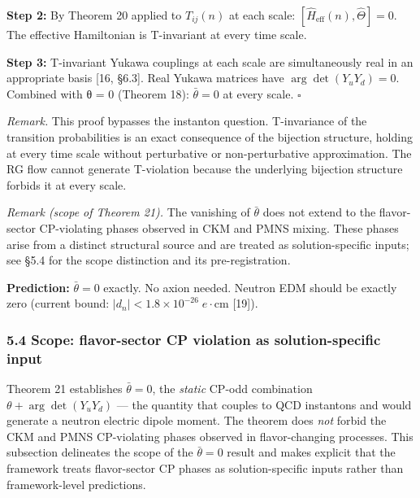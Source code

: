 \documentclass[
]{article}
\begin{document}
\textbf{Step 2:} By Theorem 20 applied to \(T_{ij}(n)\) at each scale:
\([\hat{H}_{\mathrm{eff}}(n), \hat{\Theta}] = 0\). The effective
Hamiltonian is T-invariant at every time scale.

\textbf{Step 3:} T-invariant Yukawa couplings at each scale are
simultaneously real in an appropriate basis {[}16, §6.3{]}. Real Yukawa
matrices have \(\arg\det(Y_u Y_d) = 0\). Combined with θ = 0 (Theorem
18): \(\bar{\theta} = 0\) at every scale. \(\square\)

\emph{Remark.} This proof bypasses the instanton question. T-invariance
of the transition probabilities is an exact consequence of the bijection
structure, holding at every time scale without perturbative or
non-perturbative approximation. The RG flow cannot generate T-violation
because the underlying bijection structure forbids it at every scale.

\emph{Remark (scope of Theorem 21).} The vanishing of \(\bar\theta\)
does not extend to the flavor-sector CP-violating phases observed in CKM
and PMNS mixing. These phases arise from a distinct structural source
and are treated as solution-specific inputs; see §5.4 for the scope
distinction and its pre-registration.

\textbf{Prediction:} \(\bar{\theta} = 0\) exactly. No axion needed.
Neutron EDM should be exactly zero (current bound:
\(|d_n| < 1.8 \times 10^{-26}\;e\cdot\text{cm}\) {[}19{]}).

\hypertarget{scope-flavor-sector-cp-violation-as-solution-specific-input}{%
\subsubsection{5.4 Scope: flavor-sector CP violation as
solution-specific
input}\label{scope-flavor-sector-cp-violation-as-solution-specific-input}}

Theorem 21 establishes \(\bar\theta = 0\), the \emph{static} CP-odd
combination \(\theta + \arg\det(Y_u Y_d)\) --- the quantity that couples
to QCD instantons and would generate a neutron electric dipole moment.
The theorem does \emph{not} forbid the CKM and PMNS CP-violating phases
observed in flavor-changing processes. This subsection delineates the
scope of the \(\bar\theta = 0\) result and makes explicit that the
framework treats flavor-sector CP phases as solution-specific inputs
rather than framework-level predictions.
\end{document}
